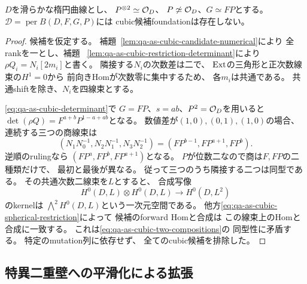 \begin{proposition}[滑らかな二重壁では任意のcubic候補が不存在]
\label{prop:qa-as-cubic-smooth-no-candidate}
$D$を滑らかな楕円曲線とし、
$P^{\otimes2}\simeq\mathcal O_D$、
$P\not\simeq\mathcal O_D$、$G\simeq FP$とする。
$\mathcal D=\operatorname{per}B(D,F,G,P)$には
cubic候補foundationは存在しない。
\end{proposition}
\begin{proof}
候補を仮定する。
補題~\ref{lem:qa-as-cubic-candidate-numerical}により
全rankを一とし、補題
~\ref{lem:qa-as-cubic-restriction-determinant}により
$\rho Q_i=N_i[2m_i]$と書く。
隣接する$N_i$の次数差は二で、
$\operatorname{Ext}$の三角形と正次数線束の$H^1=0$から
前向きHomが次数零に集中するため、
各$m_i$は共通である。
共通shiftを除き、$N_i$を四線束とする。

\eqref{eq:qa-as-cubic-determinant}で
$G=FP$、$s=ab$、$P^2=\mathcal O_D$を用いると
$\det(\rho Q)=F^{a+b}P^{1-a+ab}$となる。
数値差が$(1,0),(0,1),(1,0)$の場合、
連続する三つの商線束は
\[
(N_1N_0^{-1},N_2N_1^{-1},N_3N_2^{-1})
=(FP^{b-1},FP^{a+1},FP^b).
\]
逆順のrulingなら
$(FP^a,FP^b,FP^{a+1})$となる。
$P$が位数二なので商は$F,FP$の二種類だけで、
最初と最後が異なる。
従って三つのうち隣接する二つは同型である。
その共通次数二線束を$L$とすると、
合成写像
\[
 H^0(D,L)\otimes H^0(D,L)\longrightarrow H^0(D,L^2)
\]
のkernelは
$\bigwedge^2H^0(D,L)$という一次元空間である。
他方\eqref{eq:qa-as-cubic-spherical-restriction}によって
候補のforward Homと合成は
この線束上のHomと合成に一致する。
これは\eqref{eq:qa-as-cubic-two-compositions}の
同型性に矛盾する。
特定のmutation列に依存せず、
全てのcubic候補を排除した。
\end{proof}

\subsection{特異二重壁への平滑化による拡張}
\label{subsec:qa-as-cubic-degenerate-obstruction}


